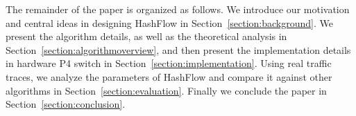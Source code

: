The remainder of the paper is organized as follows.
We introduce our motivation and central ideas in designing HashFlow in Section~\ref{section:background}. 
We present the algorithm details, as well as the theoretical analysis in Section~\ref{section:algorithmoverview}, and then present the implementation details in hardware P4 switch in Section~\ref{section:implementation}. 
Using real traffic traces, we analyze the parameters of HashFlow and compare it against other algorithms in Section~\ref{section:evaluation}.
Finally we conclude the paper in Section~\ref{section:conclusion}.
